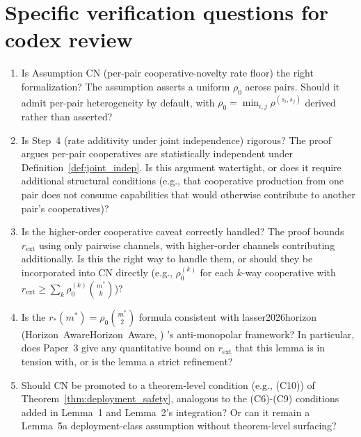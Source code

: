 \documentclass{article}
\makeatletter
\newcommand{\citep}[2][]{%
  \begingroup
  \def\@tmpkey{#2}%
  \ifx\@tmpkey\@empty\else
    (\ifx\@empty#1\@empty\else #1, \fi
     \@nameuse{bibkey@\@tmpkey})%
  \fi
  \endgroup
}
\newcommand{\rext}{r_{\mathrm{ext}}}
\makeatother
\begin{document}
\section{Specific verification questions for codex review}

\begin{enumerate}
\item Is Assumption CN (per-pair cooperative-novelty rate floor)
  the right formalization?  The assumption asserts a uniform $\rho_0$
  across pairs.  Should it admit per-pair heterogeneity by default,
  with $\rho_0 = \min_{i,j} \rho^{(s_i, s_j)}$ derived rather than
  asserted?

\item Is Step~4 (rate additivity under joint independence) rigorous?
  The proof argues per-pair cooperatives are statistically
  independent under
  Definition~\ref{def:joint_indep}.  Is this argument
  watertight, or does it require additional structural conditions
  (e.g., that cooperative production from one pair does not
  consume capabilities that would otherwise contribute to another
  pair's cooperatives)?

\item Is the higher-order cooperative caveat correctly handled?
  The proof bounds $\rext$ using only pairwise channels, with
  higher-order channels contributing additionally.  Is this the
  right way to handle them, or should they be incorporated into
  CN directly (e.g., $\rho_0^{(k)}$ for each $k$-way cooperative
  with $\rext \geq \sum_k \rho_0^{(k)} \binom{m^*}{k}$)?

\item Is the $r_*(m^*) = \rho_0 \binom{m^*}{2}$ formula consistent
  with \citep[Horizon~Aware]{lasser2026horizon}'s anti-monopolar
  framework?  In particular, does Paper~3 give any quantitative
  bound on $\rext$ that this lemma is in tension with, or is the
  lemma a strict refinement?

\item Should CN be promoted to a theorem-level condition (e.g.,
  (C10)) of Theorem~\ref{thm:deployment_safety}, analogous to
  the (C6)-(C9) conditions added in Lemma~1 and Lemma~2's
  integration?  Or can it remain a Lemma~5a deployment-class
  assumption without theorem-level surfacing?
\end{enumerate}
\end{document}
